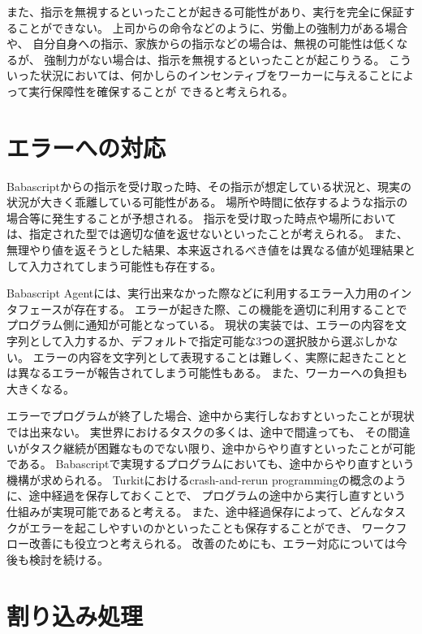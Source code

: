また、指示を無視するといったことが起きる可能性があり、実行を完全に保証することができない。
上司からの命令などのように、労働上の強制力がある場合や、
自分自身への指示、家族からの指示などの場合は、無視の可能性は低くなるが、
強制力がない場合は、指示を無視するといったことが起こりうる。
こういった状況においては、何かしらのインセンティブをワーカーに与えることによって実行保障性を確保することが
できると考えられる。

\section{エラーへの対応}\label{ux30a8ux30e9ux30fcux3078ux306eux5bfeux5fdc}

Babascriptからの指示を受け取った時、その指示が想定している状況と、現実の状況が大きく乖離している可能性がある。
場所や時間に依存するような指示の場合等に発生することが予想される。
指示を受け取った時点や場所においては、指定された型では適切な値を返せないといったことが考えられる。
また、無理やり値を返そうとした結果、本来返されるべき値をは異なる値が処理結果として入力されてしまう可能性も存在する。

Babascript
Agentには、実行出来なかった際などに利用するエラー入力用のインタフェースが存在する。
エラーが起きた際、この機能を適切に利用することでプログラム側に通知が可能となっている。
現状の実装では、エラーの内容を文字列として入力するか、デフォルトで指定可能な3つの選択肢から選ぶしかない。
エラーの内容を文字列として表現することは難しく、実際に起きたこととは異なるエラーが報告されてしまう可能性もある。
また、ワーカーへの負担も大きくなる。

エラーでプログラムが終了した場合、途中から実行しなおすといったことが現状では出来ない。
実世界におけるタスクの多くは、途中で間違っても、
その間違いがタスク継続が困難なものでない限り、途中からやり直すといったことが可能である。
Babascriptで実現するプログラムにおいても、途中からやり直すという機構が求められる。
Turkit\cite{turkit}におけるcrash-and-rerun
programmingの概念のように、途中経過を保存しておくことで、
プログラムの途中から実行し直すという仕組みが実現可能であると考える。
また、途中経過保存によって、どんなタスクがエラーを起こしやすいのかといったことも保存することができ、
ワークフロー改善にも役立つと考えられる。
改善のためにも、エラー対応については今後も検討を続ける。

\section{割り込み処理}\label{ux5272ux308aux8fbcux307fux51e6ux7406}

